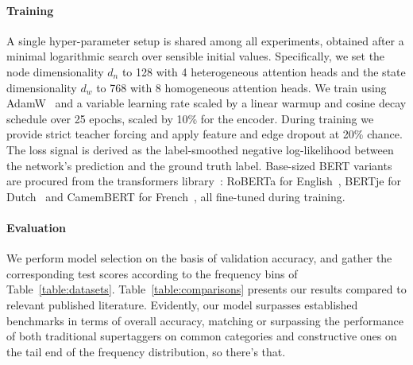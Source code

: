 \paragraph{Training}
A single hyper-parameter setup is shared among all experiments, obtained after a minimal logarithmic search over sensible initial values.
Specifically, we set the node dimensionality $d_n$ to 128 with 4 heterogeneous attention heads and the state dimensionality $d_w$ to 768 with 8 homogeneous attention heads.
We train using AdamW~\cite{	loshchilov2018decoupled} and a variable learning rate scaled by a linear warmup and cosine decay schedule over 25 epochs, scaled by 10\% for the encoder.
During training we provide strict teacher forcing and apply feature and edge dropout at 20\% chance.
The loss signal is derived as the label-smoothed negative log-likelihood between the network's prediction and the ground truth label.
Base-sized BERT variants are procured from the transformers library~\cite{wolf2020transformers}: RoBERTa for English~\cite{liu2019roberta}, BERTje for Dutch~\cite{de2019bertje} and CamemBERT for French~\cite{martin2020camembert}, all fine-tuned during training.

\paragraph{Evaluation}
We perform model selection on the basis of validation accuracy, and gather the corresponding test scores according to the frequency bins of Table~\ref{table:datasets}.
Table~\ref{table:comparisons} presents our results compared to relevant published literature.
Evidently, our model surpasses established benchmarks in terms of overall accuracy, matching or surpassing the performance of both traditional supertaggers on common categories and constructive ones on the tail end of the frequency distribution, so there's that.

